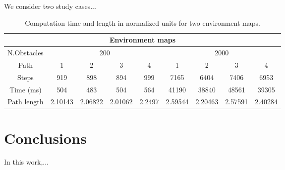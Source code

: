 \documentclass[conference]{IEEEtran}
\begin{document}
We consider two study cases...

  \vspace{-0.1 cm}
\begin{table}[H]
\begin{center}
\resizebox{9cm}{!} {
\begin{tabular}{ |c|c|c|c|c|c|c|c|c| }
\hline
\multicolumn{9}{|c|}{Environment maps}\\
\hline
\multicolumn{1}{|c}{N.Obstacles}&\multicolumn{4}{|c}{200}&\multicolumn{4}{|c|}{2000}\\
\hline
Path&1&2&3&4&1&2&3&4\\
\hline
Steps&919&898&894&999&7165&6404&7406&6953\\
\hline
Time (ms)&504&483 &504&564&41190&38840&48561&39305\\
\hline
Path length&2.10143&2.06822&2.01062&2.2497&2.59544&2.20463&2.57591&2.40284\\
\hline
\end{tabular}
}
\end{center}
\caption{Computation time and length in normalized units for two environment maps.}
\label{table:tiempos}
\end{table}


\section{Conclusions}
 In this work,...



\end{document}
